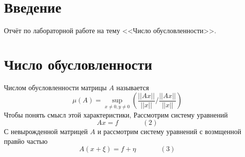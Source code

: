 \documentclass[14pt, titlepage,fleqn]{extarticle}
\begin{document}
	

	
	
	\newpage
	
	\tableofcontents   
	\clearpage
	\section*{Введение}
	Отчёт по лабораторной работе на тему <<Число обусловленности>>.	
	\newpage









	\section*{Число обусловленности}
	Числом обусловленности матрицы $A$ называется
	\[\mu(A) = \underset{x \neq 0,y\neq0}{\sup} \left(\dfrac{||Ax||}{||x||} / \dfrac{||Ax||}{||x||}\right)\]
	Чтобы понять смысл этой характеристики, Рассмотрим систему уравнений
	\[Ax = f ~~~~~~~~~~~~~~~~(2)\]
	С невырожденной матрицей $A$ и рассмотрим систему уравнений с возмщенной правйо частью
	\[A(x+\xi ) = f + \eta ~~~~~~~~~~~~~~~~(3)\]
	
\end{document}

